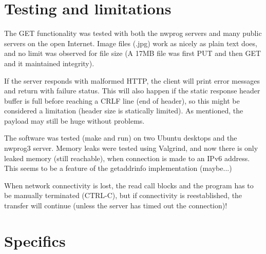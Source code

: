 \documentclass[a4paper,12pt]{article}
\begin{document}
\section{Testing and limitations}

The GET functionality was tested with both the nwprog servers and many public servers on the open Internet. Image files (.jpg) work as nicely as plain text does, and no limit was observed for file size (A 17MB file was first PUT and then GET and it maintained integrity).

If the server responds with malformed HTTP, the client will print error messages and return with failure status. This will also happen if the static response header buffer is full before reaching a CRLF line (end of header), so this might be considered a limitation (header size is statically limited). As mentioned, the payload may still be huge without problems.

The software was tested (make and run) on two Ubuntu desktops and the nwprog3 server. Memory leaks were tested using Valgrind, and now there is only leaked memory (still reachable), when connection is made to an IPv6 address. This seems to be a feature of the getaddrinfo implementation (maybe...)

When network connectivity is lost, the read call blocks and the program has to be manually terminated (CTRL-C), but if connectivity is reestablished, the transfer will continue (unless the server has timed out the connection)!

\section{Specifics}
\end{document}
